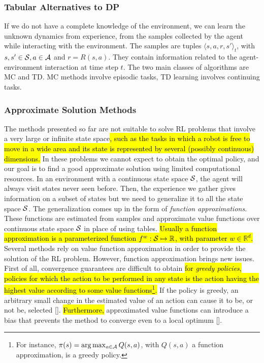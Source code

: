 \subsubsection{Tabular Alternatives to \ac{DP}}\label{subsec:alt}
If we do not have a complete knowledge of the environment, we can learn the unknown dynamics from experience, \ie from the samples collected by the agent while interacting with the environment. The samples are tuples $\langle s,a,r,s' \rangle_t$, with $s, s' \in \mathcal{S}, a \in \mathcal{A}$ and $r = R(s,a)$. They contain information related to the agent-environment interaction at time step $t$. The two main classes of algorithms are \acf{MC} and \acf{TD}. \ac{MC} methods involve episodic tasks, \ac{TD} learning involves continuing tasks. 

\subsubsection{Approximate Solution Methods}
The methods presented so far are not suitable to solve \ac{RL} problems that involve a very large or infinite state space\hl{, such as the tasks in which a robot is free to move in a wide area and its state is represented by several (possibly continuous) dimensions.} In these problems we cannot expect to obtain the optimal policy, and our goal is to find a good approximate solution using limited computational resources. In an environment with a continuous state space $\mathcal{S}$, the agent will always visit states never seen before. Then, the experience we gather gives information on a subset of states but we need to generalize it to all the state space $\mathcal{S}$. The generalization comes up in the form of \emph{function approximations}. These functions are estimated from samples and approximate value functions over continuous state space $\mathcal{S}$ in place of using tables. \hl{Usually a function approximation is a parameterized function $f^{w}: \mathcal{S} \mapsto \mathbb{R}$, with parameter $w \in \mathbb{R}^{d}$.}\\
\newline
Several methods rely on value function approximation in order to provide the solution of the \ac{RL} problem. However, function approximation brings new issues. First of all, convergence guarantees are difficult to obtain \hl{for \emph{greedy policies},} \ie \hl{policies for which the action to be performed in any state is the action having the highest value according to some value functions\footnote{For instance, $\pi(s) = \arg \max_{a \in \mathcal{A}}Q(s,a)$, with $Q(s,a)$ a function approximation, is a greedy policy.}.} If the policy is greedy, an arbitrary small change in the estimated value of an action can cause it to be, or not be, selected [\cite{Sutton1999PolicyGM}]. \hl{Furthermore,} approximated value functions can introduce a bias that prevents the method to converge even to a local optimum [\cite{deisenroth2013Survey}]. 

